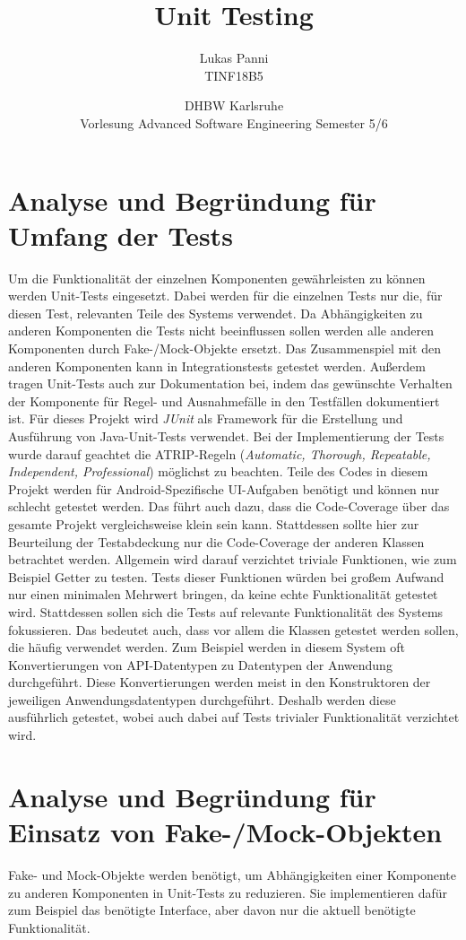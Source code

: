 \documentclass[12pt]{article}
\title{Unit Testing}
\date{DHBW Karlsruhe\\ Vorlesung Advanced Software Engineering Semester 5/6}
\author{Lukas Panni \\ TINF18B5}
\begin{document}
\maketitle

\newpage
\tableofcontents
\newpage


\section{Analyse und Begründung für Umfang der Tests}

Um die Funktionalität der einzelnen Komponenten gewährleisten zu können werden Unit-Tests eingesetzt.
Dabei werden für die einzelnen Tests nur die, für diesen Test, relevanten Teile des Systems verwendet.
Da Abhängigkeiten zu anderen Komponenten die Tests nicht beeinflussen sollen werden alle anderen Komponenten durch Fake-/Mock-Objekte ersetzt.
Das Zusammenspiel mit den anderen Komponenten kann in Integrationstests getestet werden.
Außerdem tragen Unit-Tests auch zur Dokumentation bei, indem das gewünschte Verhalten der Komponente für Regel- und Ausnahmefälle in den Testfällen dokumentiert ist.
\newline
Für dieses Projekt wird \textit{JUnit} als Framework für die Erstellung und Ausführung von Java-Unit-Tests verwendet.
Bei der Implementierung der Tests wurde darauf geachtet die ATRIP-Regeln (\textit{Automatic, Thorough, Repeatable, Independent, Professional}) möglichst zu beachten.
\newline
Teile des Codes in diesem Projekt werden für Android-Spezifische UI-Aufgaben benötigt und können nur schlecht getestet werden. Das führt auch dazu, dass die Code-Coverage über das gesamte Projekt vergleichsweise klein sein kann. Stattdessen sollte hier zur Beurteilung der Testabdeckung nur die Code-Coverage der anderen Klassen betrachtet werden.
\newline
Allgemein wird darauf verzichtet triviale Funktionen, wie zum Beispiel Getter zu testen.
Tests dieser Funktionen würden bei großem Aufwand nur einen minimalen Mehrwert bringen, da keine echte Funktionalität getestet wird.
Stattdessen sollen sich die Tests auf relevante Funktionalität des Systems fokussieren. Das bedeutet auch, dass vor allem die Klassen getestet werden sollen, die häufig verwendet werden.
\newline
Zum Beispiel werden in diesem System oft Konvertierungen von API-Datentypen zu Datentypen der Anwendung durchgeführt.
Diese Konvertierungen werden meist in den Konstruktoren der jeweiligen Anwendungsdatentypen durchgeführt.
Deshalb werden diese ausführlich getestet, wobei auch dabei auf Tests trivialer Funktionalität verzichtet wird.



\newpage
\section{Analyse und Begründung für Einsatz von Fake-/Mock-Objekten}

Fake- und Mock-Objekte werden benötigt, um Abhängigkeiten einer Komponente zu anderen Komponenten in Unit-Tests zu reduzieren.
Sie implementieren dafür zum Beispiel das benötigte Interface, aber davon nur die aktuell benötigte Funktionalität.
\end{document}
